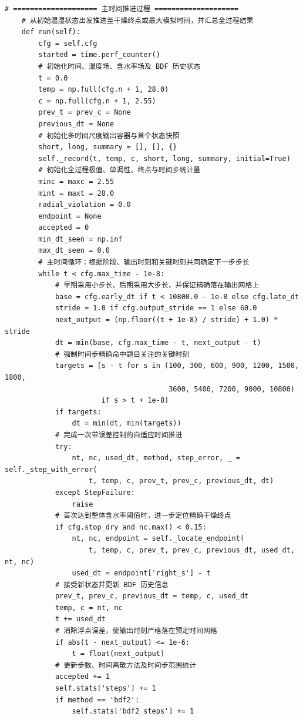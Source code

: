 \begin{Verbatim}[fontsize=\scriptsize,breaklines=true,breakanywhere=true]
    # ==================== 主时间推进过程 ====================
    # 从初始温湿状态出发推进至干燥终点或最大模拟时间，并汇总全过程结果
    def run(self):
        cfg = self.cfg
        started = time.perf_counter()
        # 初始化时间、温度场、含水率场及 BDF 历史状态
        t = 0.0
        temp = np.full(cfg.n + 1, 28.0)
        c = np.full(cfg.n + 1, 2.55)
        prev_t = prev_c = None
        previous_dt = None
        # 初始化多时间尺度输出容器与首个状态快照
        short, long, summary = [], [], {}
        self._record(t, temp, c, short, long, summary, initial=True)
        # 初始化全过程极值、单调性、终点与时间步统计量
        minc = maxc = 2.55
        mint = maxt = 28.0
        radial_violation = 0.0
        endpoint = None
        accepted = 0
        min_dt_seen = np.inf
        max_dt_seen = 0.0
        # 主时间循环：根据阶段、输出时刻和关键时刻共同确定下一步步长
        while t < cfg.max_time - 1e-8:
            # 早期采用小步长、后期采用大步长，并保证精确落在输出网格上
            base = cfg.early_dt if t < 10800.0 - 1e-8 else cfg.late_dt
            stride = 1.0 if cfg.output_stride == 1 else 60.0
            next_output = (np.floor((t + 1e-8) / stride) + 1.0) * stride
            dt = min(base, cfg.max_time - t, next_output - t)
            # 强制时间步精确命中题目关注的关键时刻
            targets = [s - t for s in (100, 300, 600, 900, 1200, 1500, 1800,
                                       3600, 5400, 7200, 9000, 10800)
                       if s > t + 1e-8]
            if targets:
                dt = min(dt, min(targets))
            # 完成一次带误差控制的自适应时间推进
            try:
                nt, nc, used_dt, method, step_error, _ = self._step_with_error(
                    t, temp, c, prev_t, prev_c, previous_dt, dt)
            except StepFailure:
                raise
            # 首次达到整体含水率阈值时，进一步定位精确干燥终点
            if cfg.stop_dry and nc.max() < 0.15:
                nt, nc, endpoint = self._locate_endpoint(
                    t, temp, c, prev_t, prev_c, previous_dt, used_dt, nt, nc)
                used_dt = endpoint['right_s'] - t
            # 接受新状态并更新 BDF 历史信息
            prev_t, prev_c, previous_dt = temp, c, used_dt
            temp, c = nt, nc
            t += used_dt
            # 消除浮点误差，使输出时刻严格落在预定时间网格
            if abs(t - next_output) <= 1e-6:
                t = float(next_output)
            # 更新步数、时间离散方法及时间步范围统计
            accepted += 1
            self.stats['steps'] += 1
            if method == 'bdf2':
                self.stats['bdf2_steps'] += 1

\end{Verbatim}
